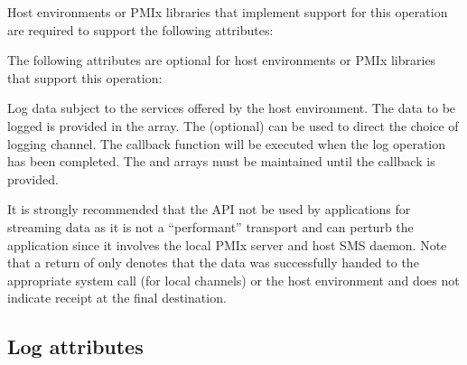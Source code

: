 \divider

Host environments or \ac{PMIx} libraries that implement support for this operation are required to support the following attributes:


\reqattrend

\optattrstart
The following attributes are optional for host environments or \ac{PMIx} libraries that support this operation:


\optattrend

\descr

Log data subject to the services offered by the host environment. The data to be logged is provided in the  array. The (optional)  can be used to direct the choice of logging channel.
The callback function will be executed when the log operation has been completed. The  and  arrays must be maintained until the callback is provided.

\adviceuserstart
It is strongly recommended that the  API not be used by applications for streaming data as it is not a ``performant'' transport and can perturb the application since it involves the local \ac{PMIx} server and host \ac{SMS} daemon. Note that a return of  only denotes that the data was successfully handed to the appropriate system call (for local channels) or the host environment and does not indicate receipt at the final destination.
\adviceuserend

\subsection{Log attributes}
\label{api:struct:attributes:log}

